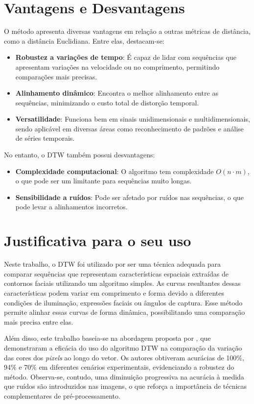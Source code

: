 \section{Vantagens e Desvantagens}

O método apresenta diversas vantagens em relação a outras métricas de distância, como a distância Euclidiana. Entre elas, destacam-se:
\begin{itemize}
    \item \textbf{Robustez a variações de tempo}: É capaz de lidar com sequências que apresentam variações na velocidade ou no comprimento, permitindo comparações mais precisas.
    \item \textbf{Alinhamento dinâmico}: Encontra o melhor alinhamento entre as sequências, minimizando o custo total de distorção temporal.
    \item \textbf{Versatilidade}: Funciona bem em sinais unidimensionais e multidimensionais, sendo aplicável em diversas áreas como reconhecimento de padrões e análise de séries temporais.
\end{itemize}

No entanto, o DTW também possui desvantagens:
\begin{itemize}
    \item \textbf{Complexidade computacional}: O algoritmo tem complexidade \(O(n \cdot m)\), o que pode ser um limitante para sequências muito longas.
    \item \textbf{Sensibilidade a ruídos}: Pode ser afetado por ruídos nas sequências, o que pode levar a alinhamentos incorretos.
\end{itemize}


\section{Justificativa para o seu uso}

Neste trabalho, o DTW foi utilizado por ser uma técnica adequada para comparar sequências que representam características espaciais extraídas de contornos faciais utilizando um algoritmo simples. As curvas resultantes dessas características podem variar em comprimento e forma devido a diferentes condições de iluminação, expressões faciais ou ângulos de captura. Esse método permite alinhar essas curvas de forma dinâmica, possibilitando uma comparação mais precisa entre elas.

Além disso, este trabalho baseia-se na abordagem proposta por \citet{DTW_LSTM}, que demonstraram a eficácia do uso do algoritmo DTW na comparação da variação das cores dos \textit{pixels} ao longo do vetor. Os autores obtiveram acurácias de 100\%, 94\% e 70\% em diferentes cenários experimentais, evidenciando a robustez do método. Observa-se, contudo, uma diminuição progressiva na acurácia à medida que ruídos são introduzidos nas imagens, o que reforça a importância de técnicas complementares de pré-processamento.


